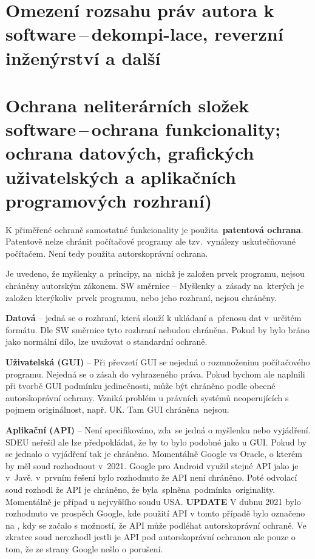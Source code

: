 \newpage
\section[Omezení rozsahu práv autora k software\,--\,dekompilace, reverzní inženýrství a další]{Omezení rozsahu práv autora k software\,--\,dekompi-lace, reverzní inženýrství a další}

\newpage
\section{Ochrana neliterárních složek software\,--\,ochrana funkcionality; ochrana datových, grafických uživatelských a aplikačních programových rozhraní)}

K přiměřené ochraně samostatné funkcionality je použita~\textbf{patentová ochrana}. Patentově nelze chránit počítačové programy ale tzv.\ vynálezy uskutečňované počítačem. Není tedy použita autorskoprávní ochrana.

Je uvedeno, že myšlenky a~principy, na~nichž je založen prvek programu, nejsou chráněny autorským zákonem. SW směrnice -- Myšlenky a~zásady na~kterých je založen kterýkoliv~prvek programu, nebo jeho rozhraní, nejsou chráněny. 

\textbf{Datová} -- jedná se o rozhraní, která slouží k ukládaní a~přenosu dat v~určitém formátu. Dle SW směrnice tyto rozhraní nebudou chráněna. Pokud by bylo bráno jako normální dílo, lze uvažovat o standardní ochraně.

\textbf{Uživatelská (GUI)} -- Při převzetí GUI se nejedná o rozmnoženinu počítačového programu. \textrightarrow Nejedná se o zásah do vyhrazeného práva. Pokud bychom ale naplnili při tvorbě GUI podmínku jedinečnosti, může být chráněno podle obecné autorskoprávní ochrany. Vzniká problém u právních systémů neoperujících s pojmem originálnost, např. UK. Tam GUI chráněna~nejsou.

\textbf{Aplikační (API)} -- Není specifikováno, zda~se jedná o myšlenku nebo vyjádření. SDEU neřešil ale lze předpokládat, že by to bylo podobné jako u GUI. Pokud by se jednalo o vyjádření tak je chráněno. Momentálně Google vs Oracle, o kterém by měl soud rozhodnout v~2021. Google pro Android využil stejné API jako je v~Javě. v~prvním řešení bylo rozhodnuto že API není chráněno. Poté odvolací soud rozhodl že API je chráněno, že byla~splněna~podmínka~originality. Momentálně je případ u nejvyššího soudu USA. \textbf{UPDATE} V dubnu 2021 bylo rozhodnuto ve prospěch Google, kde použití API v tomto případě bylo označeno na , kdy se začalo s možností, že API může podléhat autorskoprávní ochraně. Ve zkratce soud nerozhodl jestli je API pod autorskoprávní ochranou ale pouze o tom, že ze strany Google nešlo o porušení.  




